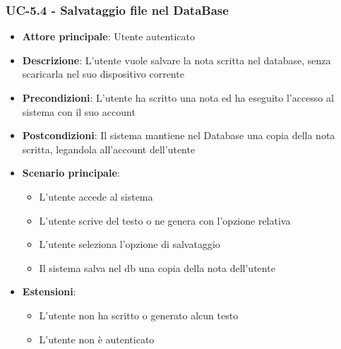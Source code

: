 \documentclass[11pt,a4paper]{article}
\begin{document}
\subsubsection{UC-5.4 - Salvataggio file nel DataBase}
\begin{itemize}
    \item \textbf{Attore principale}: Utente autenticato
    \item \textbf{Descrizione}: L'utente vuole salvare la nota scritta nel database, senza scaricarla nel suo dispositivo corrente
    \item \textbf{Precondizioni}: L'utente ha scritto una nota ed ha eseguito l'accesso al sistema con il suo account
    \item \textbf{Postcondizioni}: Il sistema mantiene nel Database una copia della nota scritta, legandola all'account dell'utente
    \item \textbf{Scenario principale}:
        \begin{itemize}
            \item L'utente accede al sistema
            \item L'utente scrive del testo o ne genera con l'opzione relativa
            \item L'utente seleziona l'opzione di salvataggio
            \item Il sistema salva nel db una copia della nota dell'utente
        \end{itemize}
    \item \textbf{Estensioni}:
        \begin{itemize}
            \item L'utente non ha scritto o generato alcun testo
            \item L'utente non è autenticato
        \end{itemize}
\end{itemize}
\end{document}

